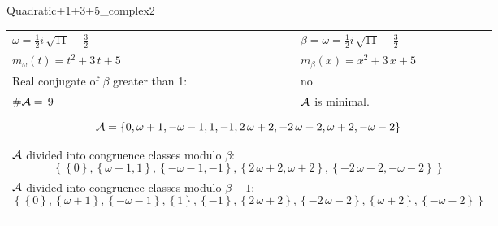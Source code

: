 \begin{exmp}
\label{ex:compareAO}

Quadratic+1+3+5\_complex2 

\rule{0cm}{0cm}

\begin{tabular}{ll}
$\omega=  \frac{1}{2} i \, \sqrt{11} - \frac{3}{2} $  & $\beta= \omega = \frac{1}{2} i \, \sqrt{11} - \frac{3}{2} $\\
$m_\omega(t)=  t^{2} + 3 \, t + 5 $  & $m_\beta(x)=  x^{2} + 3 \, x + 5 $\\
Real conjugate of $\beta$ greater than 1:   &  no \\
$\#\mathcal{A}= $ 9 $ $ & $\mathcal{A}$ is minimal. \\
\multicolumn{2}{l}{\begin{minipage}{\textwidth}\begin{dmath*}\A = \left\{0, \omega + 1, -\omega - 1, 1, -1, 2 \, \omega + 2, -2 \, \omega - 2, \omega + 2, -\omega - 2\right\}  \end{dmath*}\end{minipage} }\\
\multicolumn{2}{l}{\begin{minipage}{\textwidth}$\mathcal{A}$ divided into congruence classes modulo $\beta$: \begin{dmath*} \left\{\left\{0\right\}, \left\{\omega + 1, 1\right\}, \left\{-\omega - 1, -1\right\}, \left\{2 \, \omega + 2, \omega + 2\right\}, \left\{-2 \, \omega - 2, -\omega - 2\right\}\right\}  \end{dmath*}\end{minipage} }\\[10pt]
\multicolumn{2}{l}{\begin{minipage}{\textwidth}$\mathcal{A}$ divided into congruence classes modulo $\beta-1$: \begin{dmath*} \left\{\left\{0\right\}, \left\{\omega + 1\right\}, \left\{-\omega - 1\right\}, \left\{1\right\}, \left\{-1\right\}, \left\{2 \, \omega + 2\right\}, \left\{-2 \, \omega - 2\right\}, \left\{\omega + 2\right\}, \left\{-\omega - 2\right\}\right\}  \end{dmath*}\end{minipage} }\\
 & \\ \hline
 & \\
\end{tabular}


\end{exmp}
